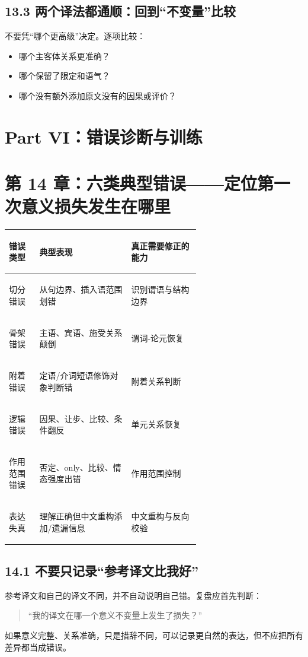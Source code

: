 \documentclass[11pt,a4paper]{ctexart}
\begin{document}
\subsection{13.3 两个译法都通顺：回到“不变量”比较}
不要凭“哪个更高级”决定。逐项比较：
\begin{itemize}
  \item 哪个主客体关系更准确？
  \item 哪个保留了限定和语气？
  \item 哪个没有额外添加原文没有的因果或评价？
\end{itemize}

\newpage
\section{Part VI：错误诊断与训练}

\section{第 14 章：六类典型错误——定位第一次意义损失发生在哪里}

\begin{center}
\small
\begin{tabularx}{\linewidth}{>{\bfseries\raggedright\arraybackslash}p{0.16\linewidth} >{\raggedright\arraybackslash}p{0.48\linewidth} Y}
\toprule
错误类型 & 典型表现 & 真正需要修正的能力 \\
\midrule
切分错误 & 从句边界、插入语范围划错 & 识别谓语与结构边界 \\
骨架错误 & 主语、宾语、施受关系颠倒 & 谓词-论元恢复 \\
附着错误 & 定语/介词短语修饰对象判断错 & 附着关系判断 \\
逻辑错误 & 因果、让步、比较、条件翻反 & 单元关系恢复 \\
作用范围错误 & 否定、only、比较、情态强度出错 & 作用范围控制 \\
表达失真 & 理解正确但中文重构添加/遗漏信息 & 中文重构与反向校验 \\
\bottomrule
\end{tabularx}
\end{center}

\subsection{14.1 不要只记录“参考译文比我好”}
参考译文和自己的译文不同，并不自动说明自己错。复盘应首先判断：
\begin{quote}
“我的译文在哪一个意义不变量上发生了损失？”
\end{quote}
如果意义完整、关系准确，只是措辞不同，可以记录更自然的表达，但不应把所有差异都当成错误。
\end{document}
